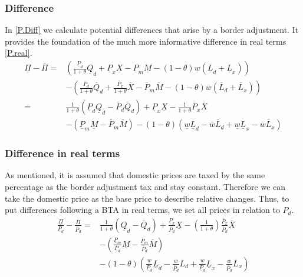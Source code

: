 \subsubsection*{Difference}
In \eqref{P.Diff} we calculate potential differences that arise by a border adjustment. It provides the foundation of the much more informative difference in real terms \eqref{P.real}.
\begin{equation}\label{P.Diff}
\begin{aligned}
\underline \Pi - \overline \Pi = & \left( \frac{\underline P_d}{1+\theta}\underline Q_d +\underline P_x\underline X -  \underline P_m \underline M -  \left( 1-\theta \right) \underline w  \left( \underline L_d + \underline L_x \right)  \right)  \\ &-  \left( \frac{\overline P_d}{1+\theta}\overline Q_d + \frac{\overline P_x}{1+\theta}\overline X - \overline P_m \overline M  -  \left( 1-\theta \right) \overline w  \left( \overline L_d + \overline L_x \right)  \right) \\ 
= &\frac{1}{1+\theta}  \left( \underline P_d \underline Q_d - \overline P_d  \overline Q_d \right)  +\underline P_x\underline X - \frac{1}{1+\theta}\overline P_x \overline X \\ &-  \left(  \underline P_m \underline M -  \overline P_m \overline M \right)  -  \left( 1-\theta \right)  \left( \underline w \underline L_d - \overline w \overline L_d + \underline w \underline L_x - \overline w \overline L_x \right) 
\end{aligned}
\end{equation}

\subsubsection*{Difference in real terms}
As mentioned, it is assumed that domestic prices are taxed by the same percentage as the border adjustment tax and stay constant. Therefore we can take the domestic price as the base price to describe relative changes. Thus, to put differences following a BTA in real terms, we set all prices in relation to $P_d$.
\begin{equation}\label{P.real}
\begin{aligned}
\frac{\underline \Pi}{\underline P_d} - \frac{\overline \Pi}{\overline P_d} = &\frac{1}{1+\theta} \left( \underline Q_d - \overline Q_d \right)  + \frac{\underline P_x}{\overline P_d}\underline X -  \left( \frac{1}{1+\theta} \right) \frac{\overline P_x}{\overline P_d}\overline X \\ &-  \left( \frac{ \underline P_m}{\underline P_d}\underline M - \frac{\overline P_m}{\overline P_d}\overline M \right)  \\ &-  \left( 1-\theta \right)  \left( \frac {\underline w}{\underline P_d} \underline L_d - \frac {\overline w}{\overline P_d} \overline L_d + \frac {\underline w}{\underline P_d} \underline L_x - \frac {\overline w}{\overline P_d} \overline L_x \right) 
\end{aligned}
\end{equation}

